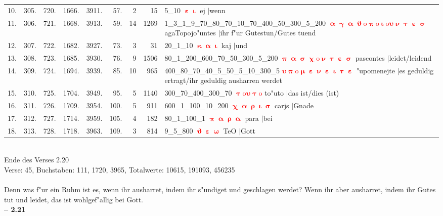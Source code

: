 \documentclass[a4paper,10pt,landscape]{article}
\begin{document}
\begin{tabular}{rrrrrrrrp{120mm}}
10.&305.&720.&1666.&3911.&57.&2&15&5\_10 \textcolor{red}{$\boldsymbol{\upepsilon\upiota}$} ej $|$wenn\\
11.&306.&721.&1668.&3913.&59.&14&1269&1\_3\_1\_9\_70\_80\_70\_10\_70\_400\_50\_300\_5\_200 \textcolor{red}{$\boldsymbol{\upalpha\upgamma\upalpha\upvartheta\mathrm{o}\uppi\mathrm{o}\upiota\mathrm{o}\upsilon\upnu\uptau\upepsilon\upsigma}$} agaTopojo"untes $|$ihr f"ur Gutestun/Gutes tuend\\
12.&307.&722.&1682.&3927.&73.&3&31&20\_1\_10 \textcolor{red}{$\boldsymbol{\upkappa\upalpha\upiota}$} kaj $|$und\\
13.&308.&723.&1685.&3930.&76.&9&1506&80\_1\_200\_600\_70\_50\_300\_5\_200 \textcolor{red}{$\boldsymbol{\uppi\upalpha\upsigma\upchi\mathrm{o}\upnu\uptau\upepsilon\upsigma}$} pascontes $|$leidet/leidend\\
14.&309.&724.&1694.&3939.&85.&10&965&400\_80\_70\_40\_5\_50\_5\_10\_300\_5 \textcolor{red}{$\boldsymbol{\upsilon\uppi\mathrm{o}\upmu\upepsilon\upnu\upepsilon\upiota\uptau\upepsilon}$} "upomenejte $|$es geduldig ertragt/ihr geduldig ausharren werdet\\
15.&310.&725.&1704.&3949.&95.&5&1140&300\_70\_400\_300\_70 \textcolor{red}{$\boldsymbol{\uptau\mathrm{o}\upsilon\uptau\mathrm{o}}$} to"uto $|$das ist/dies (ist)\\
16.&311.&726.&1709.&3954.&100.&5&911&600\_1\_100\_10\_200 \textcolor{red}{$\boldsymbol{\upchi\upalpha\uprho\upiota\upsigma}$} carjs $|$Gnade\\
17.&312.&727.&1714.&3959.&105.&4&182&80\_1\_100\_1 \textcolor{red}{$\boldsymbol{\uppi\upalpha\uprho\upalpha}$} para $|$bei\\
18.&313.&728.&1718.&3963.&109.&3&814&9\_5\_800 \textcolor{red}{$\boldsymbol{\upvartheta\upepsilon\upomega}$} TeO $|$Gott\\
\end{tabular}\medskip \\
Ende des Verses 2.20\\
Verse: 45, Buchstaben: 111, 1720, 3965, Totalwerte: 10615, 191093, 456235\\
\\
Denn was f"ur ein Ruhm ist es, wenn ihr ausharret, indem ihr s"undiget und geschlagen werdet? Wenn ihr aber ausharret, indem ihr Gutes tut und leidet, das ist wohlgef"allig bei Gott.\\
\newpage 
{\bf -- 2.21}\\
\medskip \\
\end{document}
